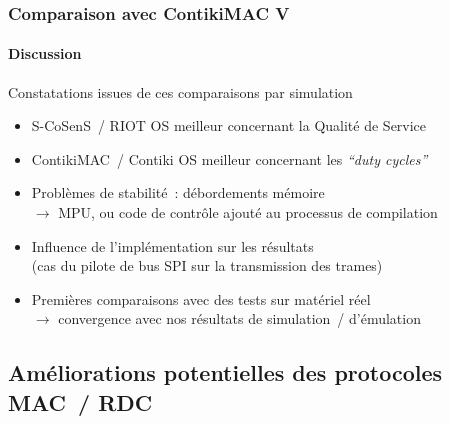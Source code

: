 \documentclass[10pt,c]{beamer}
\newcommand{\lang}[1]{\textit{#1}}
\begin{document}
\begin{frame}[label=comparContikiMAC5]
\frametitle{Comparaison avec ContikiMAC V}
\framesubtitle{Discussion}

\vspace{-0.25cm}

\begin{block}{Constatations issues de ces comparaisons par simulation}
\begin{itemize}
\item S-CoSenS~/ RIOT OS meilleur concernant la Qualité de Service
\item ContikiMAC~/ Contiki OS meilleur concernant les \lang{``duty cycles''}
\item Problèmes de stabilité~: débordements mémoire \\ 
      $\rightarrow$ MPU, ou code de contrôle ajouté au processus
       de compilation
\item Influence de l'implémentation sur les résultats \\
      (cas du pilote de bus SPI sur la transmission des trames)
\item Premières comparaisons avec des tests sur matériel réel \\
      $\rightarrow$ convergence avec nos résultats de simulation~/
       d'émulation
\end{itemize}
\end{block}

\end{frame}


\subsection{Améliorations potentielles des protocoles MAC~/ RDC}
\end{document}
